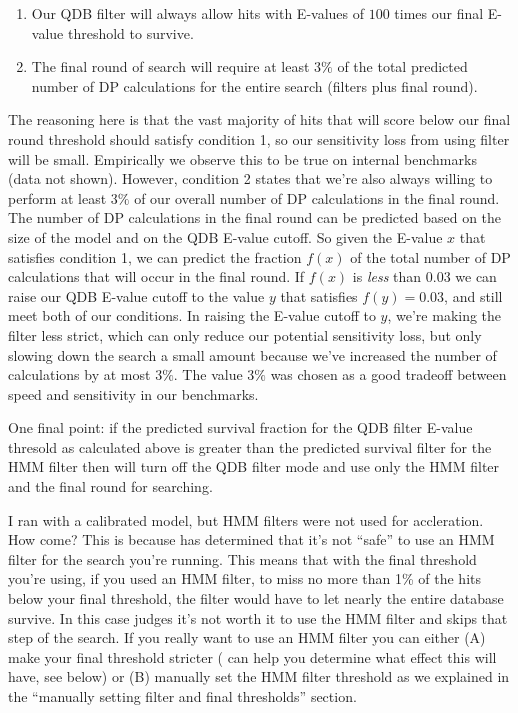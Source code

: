 \begin{enumerate}
\item
Our QDB filter will always allow hits with E-values of $100$ times our
final E-value threshold to survive. 
\item
The final round of search will require at least $3\%$ of the total
predicted number of DP calculations for the entire search (filters
plus final round).
\end{enumerate}

The reasoning here is that the vast majority of hits that will score
below our final round threshold should satisfy condition 1, so
our sensitivity loss from using filter will be small. Empirically we
observe this to be true on internal benchmarks (data not shown).
However, condition 2 states that we're also always willing to perform
at least $3\%$ of our overall number of DP calculations in the final
round. The number of DP calculations in the final round can be
predicted based on the size of the model and on the QDB E-value
cutoff. So given the E-value $x$ that satisfies condition 1, we can
predict the fraction $f(x)$ of the total number of DP calculations that will
occur in the final round. If $f(x)$ is \emph{less} than $0.03$ we can
raise our QDB E-value cutoff to the value $y$ that satisfies $f(y) = 0.03$, and
still meet both of our conditions. In raising the E-value cutoff to
$y$, we're making the filter less strict, which can only reduce our
potential sensitivity loss, but only slowing down the search a small
amount because we've increased the number of calculations by at most
$3\%$.  The value $3\%$ was chosen as a good tradeoff between speed
and sensitivity in our benchmarks. 

One final point: if the predicted survival fraction for the QDB filter
E-value thresold as calculated above is greater than the predicted
survival filter for the HMM filter then  will turn off
the QDB filter mode and use only the HMM filter and the final round
for searching.


\begin{srefaq}{I ran  with a calibrated model, but HMM
    filters were not used for accleration. How come?} This is because
     has determined that it's not ``safe'' to use
    an HMM filter for the search you're running. This means that with
    the final threshold you're using, if you used an HMM filter, 
    to miss no more than 1\% of the hits below your final threshold,
    the filter would have to let nearly the entire database
    survive. In this case  judges it's not worth it to
    use the HMM filter and skips that step of the search. If you
    really want to use an HMM filter you can either (A) make your
    final threshold stricter ( can help you determine 
    what effect this will have, see below) or (B) manually set the HMM
    filter threshold as we explained in the ``manually setting filter
    and final thresholds'' section.
\end{srefaq}

